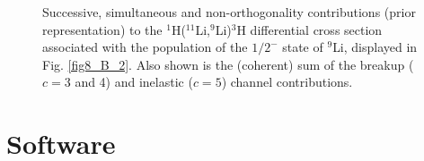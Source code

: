 \begin{subappendices}
\begin{figure}
        	\caption{Successive, simultaneous and non-orthogonality contributions (prior representation)
        	to the  $^1$H($^{11}$Li,$^9$Li)$^3$H differential cross section
        	associated with the population of the $1/2^-$ state
        	of $^9$Li, displayed in Fig. \ref{fig8_B_2}. Also shown is the (coherent) sum of the breakup ($c=3$ and 4) and inelastic ($c=5$) channel contributions.}\label{fig8_B_3}
        \end{figure}

\section{Software}\label{C8AppD}
%
%
%
%
%
%
%
%
%

\end{subappendices}
